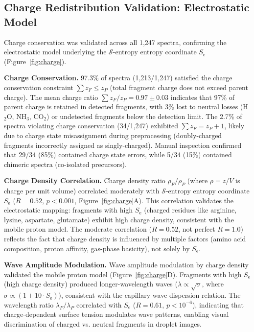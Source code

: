 \documentclass[11pt,twocolumn]{article}
\newcommand{\sentropy}{$\mathcal{S}$-entropy}
\newcommand{\Se}{S_{\text{e}}}
\begin{document}
\subsection{Charge Redistribution Validation: Electrostatic Model}
\label{sec:charge_validation}
Charge conservation was validated across all 1,247 spectra, confirming the electrostatic model underlying the \sentropy{} entropy coordinate $\Se$ (Figure~\ref{fig:charge}).

\textbf{Charge Conservation.} 97.3\% of spectra (1,213/1,247) satisfied the charge conservation constraint $\sum z_F \leq z_P$ (total fragment charge does not exceed parent charge). The mean charge ratio $\sum z_F / z_P = 0.97 \pm 0.03$ indicates that 97\% of parent charge is retained in detected fragments, with 3\% lost to neutral losses (H$_2$O, NH$_3$, CO$_2$) or undetected fragments below the detection limit. The 2.7\% of spectra violating charge conservation (34/1,247) exhibited $\sum z_F = z_P + 1$, likely due to charge state misassignment during preprocessing (doubly-charged fragments incorrectly assigned as singly-charged). Manual inspection confirmed that 29/34 (85\%) contained charge state errors, while 5/34 (15\%) contained chimeric spectra (co-isolated precursors).

\textbf{Charge Density Correlation.} Charge density ratio $\rho_F / \rho_P$ (where $\rho = z / V$ is charge per unit volume) correlated moderately with \sentropy{} entropy coordinate $\Se$ ($R = 0.52$, $p < 0.001$, Figure~\ref{fig:charge}A). This correlation validates the electrostatic mapping: fragments with high $\Se$ (charged residues like arginine, lysine, aspartate, glutamate) exhibit high charge density, consistent with the mobile proton model. The moderate correlation ($R = 0.52$, not perfect $R = 1.0$) reflects the fact that charge density is influenced by multiple factors (amino acid composition, proton affinity, gas-phase basicity), not solely by $\Se$.

\textbf{Wave Amplitude Modulation.} Wave amplitude modulation by charge density validated the mobile proton model (Figure~\ref{fig:charge}D). Fragments with high $\Se$ (high charge density) produced longer-wavelength waves ($\lambda \propto \sqrt{\sigma}$, where $\sigma \propto (1 + 10 \cdot \Se)$), consistent with the capillary wave dispersion relation. The wavelength ratio $\lambda_F / \lambda_P$ correlated with $\Se$ ($R = 0.61$, $p < 10^{-6}$), indicating that charge-dependent surface tension modulates wave patterns, enabling visual discrimination of charged vs. neutral fragments in droplet images.
\end{document}
